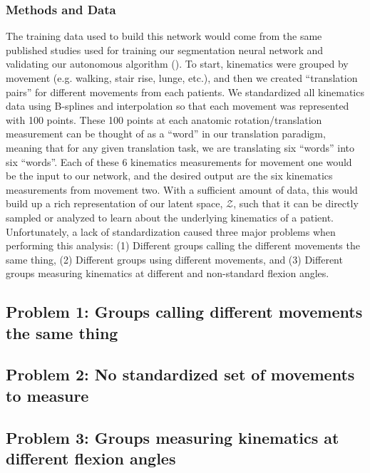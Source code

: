 \subsubsection{Methods and Data}
The training data used to build this network would come from the same published studies used for training our segmentation neural network and validating our autonomous algorithm ().
To start, kinematics were grouped by movement (e.g. walking, stair rise, lunge, etc.), and then we created ``translation pairs'' for different movements from each patients.
We standardized all kinematics data using B-splines and interpolation so that each movement was represented with 100 points.
These 100 points at each anatomic rotation/translation measurement can be thought of as a ``word'' in our translation paradigm, meaning that for any given translation task, we are translating six ``words'' into six ``words''.
Each of these 6 kinematics measurements for movement one would be the input to our network, and the desired output are the six kinematics measurements from movement two.
With a sufficient amount of data, this would build up a rich representation of our latent space, $\mathcal{Z}$, such that it can be directly sampled or analyzed to learn about the underlying kinematics of a patient.
Unfortunately, a lack of standardization caused three major problems when performing this analysis: (1) Different groups calling the different movements the same thing, (2) Different groups using different movements, and (3) Different groups measuring kinematics at different and non-standard flexion angles.

\subsection{Problem 1: Groups calling different movements the same thing}
\subsection{Problem 2: No standardized set of movements to measure}
\subsection{Problem 3: Groups measuring kinematics at different flexion angles}

